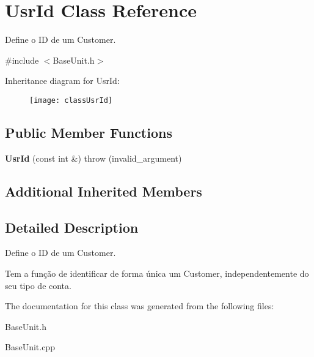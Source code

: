 \hypertarget{classUsrId}{\section{Usr\-Id Class Reference}
\label{classUsrId}
}


Define o I\-D de um Customer.  




{\ttfamily \#include $<$Base\-Unit.\-h$>$}

Inheritance diagram for Usr\-Id\-:\begin{figure}[H]
\begin{center}
\leavevmode
\texttt{[image: classUsrId]}
\end{center}
\end{figure}
\subsection*{Public Member Functions}
\begin{DoxyCompactItemize}
\item 
\hypertarget{classUsrId_a3be81b6f539c0121803f9d88e9d89553}{{\bfseries Usr\-Id} (const int \&)  throw (invalid\-\_\-argument)}\label{classUsrId_a3be81b6f539c0121803f9d88e9d89553}

\end{DoxyCompactItemize}
\subsection*{Additional Inherited Members}


\subsection{Detailed Description}
Define o I\-D de um Customer. 

Tem a função de identificar de forma única um Customer, independentemente do seu tipo de conta. 

The documentation for this class was generated from the following files\-:\begin{DoxyCompactItemize}
\item 
Base\-Unit.\-h\item 
Base\-Unit.\-cpp\end{DoxyCompactItemize}
